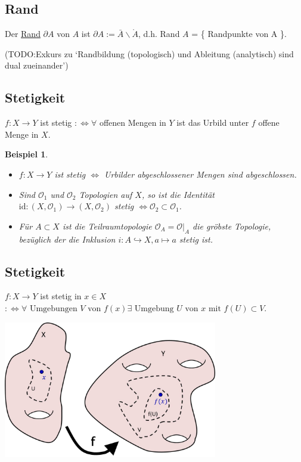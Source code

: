 \documentclass[a4paper,11pt,notitlepage]{report}
\newtheorem{example}{Beispiel}[chapter]
\newcommand{\OO}{{\ensuremath{\mathcal{O}}}}
\newenvironment{Kasten}[1]
{
\hspace{0.05\linewidth}
\begin{center}
\begin{minipage}{0.9\linewidth}
\setlength{\fboxsep}{10pt}
\definecolor{shadecolor}{gray}{1}
\definecolor{framecolor}{gray}{0}
\def\FrameCommand{\fcolorbox{framecolor}{shadecolor}}
\MakeFramed {\FrameRestore}
\subsection{#1}
\begin{itshape}
}
{
\end{itshape}
\endMakeFramed
\end{minipage}
\end{center}
}
\begin{document}
\begin{Kasten}{Rand}
	Der \underline{Rand} $\partial A$ von $A$ ist $\partial A := \bar{A} \backslash \mathring A$, d.h. Rand $A$ = \{ Randpunkte von A \}.
\end{Kasten}

(TODO:Exkurs zu `Randbildung (topologisch) und Ableitung (analytisch) sind dual zueinander')

\begin{Kasten}{Stetigkeit}
	$f \colon X \rightarrow Y$ ist stetig $:\Leftrightarrow \forall$ offenen Mengen in $Y$ ist das Urbild unter $f$ offene Menge in $X$.
\end{Kasten}

\begin{example}
	\begin{itemize}
		\item $f \colon X \rightarrow Y$ ist stetig $\Leftrightarrow$ Urbilder abgeschlossener Mengen sind abgeschlossen.
		\item Sind $\OO_1$ und $\OO_2$ Topologien auf $X$, so ist die Identität $\text{id} \colon (X,\OO_1) \rightarrow (X,\OO_2)$ stetig $\Leftrightarrow \OO_2 \subset \OO_1$.
		\item Für $A \subset X$ ist die Teilraumtopologie $\OO_A = \OO \big |_A$ die gröbste Topologie, bezüglich der die Inklusion $i \colon A \hookrightarrow X, a \mapsto a$ stetig ist.
	\end{itemize}
\end{example}

\begin{Kasten}{Stetigkeit} %
	$f \colon X \rightarrow Y$ ist stetig in $x \in X$
	$:\Leftrightarrow \forall \text{ Umgebungen } V \text{ von } f(x) \exists \text{ Umgebung } U \text{ von } x \text{ mit } f(U) \subset V$.
	\newline
\end{Kasten}
\includegraphics[width=0.7\textwidth]{images/stetig_in_x.jpg}
\end{document}
